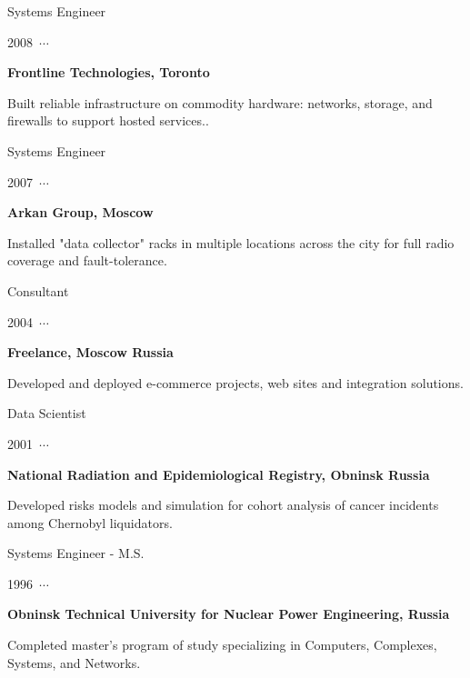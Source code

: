 \documentclass{article}
\newcommand\boldm[1]{\textcolor{red}{\mbox{\footnotesize\mb{#1}}}}
\newcommand\ytl[4]{
\parbox[b]{16em}{\footnotesize\color{cyan}\bfseries\sffamily 
\begin{minipage}[c]{1em}
  \boldm{$>$}
\end{minipage}
\begin{minipage}[c]{13em}
    \raggedright{#2}
\end{minipage}
#1~$\cdots$~}\makebox[0pt][c]{$\bullet$}\vrule\quad \parbox[c]{30em}{\vspace{12pt}\color{red!40!black!80}
\sffamily\small\textbf{#3}\\
\raggedright\small#4.}}
\begin{document}
\begin{table}[hbt!]
\ytl{2008}
{Systems Engineer}
{Frontline Technologies, Toronto}
{Built reliable infrastructure on commodity hardware: networks, storage, and firewalls to support hosted services.}

\ytl{2007}
{Systems Engineer}
{Arkan Group, Moscow}
{Installed "data collector" racks in multiple locations across the city for full radio coverage and fault-tolerance}

\ytl{2004}
{Consultant}
{Freelance, Moscow Russia}
{Developed and deployed e-commerce projects, web sites and integration solutions}

\ytl{2001}
{Data Scientist}
{National Radiation and Epidemiological Registry, Obninsk Russia}
{Developed risks models and simulation for cohort analysis of cancer incidents among Chernobyl liquidators}

\ytl{1996}
{Systems Engineer - M.S.}
{Obninsk Technical University for Nuclear Power Engineering, Russia}
{Completed master's program of study specializing in Computers, Complexes, Systems, and Networks}


\end{table}
\end{document}
